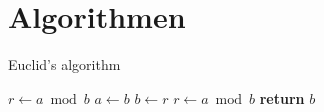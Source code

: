 \documentclass[a4paper]{amsart}
\begin{document}
\section{Algorithmen}

\begin{algorithm}
    \caption{Euclid's algorithm}\label{euclid}
    \begin{algorithmic}[1]
            \State $r\gets a\bmod b$
                \State $a\gets b$
                \State $b\gets r$
                \State $r\gets a\bmod b$
            \EndWhile\label{euclidendwhile}
            \State \textbf{return} $b$
        \EndProcedure
    \end{algorithmic}
\end{algorithm}
\end{document}
